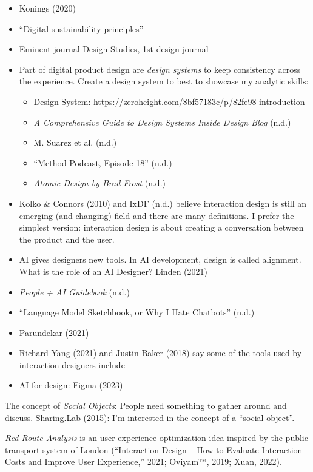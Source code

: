 \documentclass[
  letterpaper,
  DIV=11,
  numbers=noendperiod]{scrartcl}
\providecommand{\tightlist}{%
  \setlength{\itemsep}{0pt}\setlength{\parskip}{0pt}}\usepackage{longtable,booktabs,array}
\begin{document}
\begin{itemize}
\tightlist
\item
  Konings (2020)
\item
  ``Digital sustainability principles''
\item
  Eminent journal Design Studies, 1st design journal
\item
  Part of digital product design are \emph{design systems} to keep
  consistency across the experience. Create a design system to best to
  showcase my analytic skills:

  \begin{itemize}
  \tightlist
  \item
    Design System:
    https://zeroheight.com/8bf57183c/p/82fe98-introduction
  \item
    \emph{A Comprehensive Guide to Design Systems {\textbar} {Inside
    Design Blog}} (n.d.)
  \item
    M. Suarez et al. (n.d.)
  \item
    {``Method {Podcast}, {Episode} 18''} (n.d.)
  \item
    \emph{Atomic {Design} by {Brad Frost}} (n.d.)
  \end{itemize}
\item
  Kolko \& Connors (2010) and IxDF (n.d.) believe interaction design is
  still an emerging (and changing) field and there are many definitions.
  I prefer the simplest version: interaction design is about creating a
  conversation between the product and the user.
\item
  AI gives designers new tools. In AI development, design is called
  alignment. What is the role of an AI Designer? Linden (2021)
\item
  \emph{People + {AI Guidebook}} (n.d.)
\item
  {``Language {Model Sketchbook}, or {Why I Hate Chatbots}''} (n.d.)
\item
  Parundekar (2021)
\item
  Richard Yang (2021) and Justin Baker (2018) say some of the tools used
  by interaction designers include
\item
  AI for design: Figma (2023)
\end{itemize}

The concept of \emph{Social Objects}: People need something to gather
around and discuss. Sharing.Lab (2015): I'm interested in the concept of
a ``social object''.

\emph{Red Route Analysis} is an user experience optimization idea
inspired by the public transport system of London ({``Interaction
{Design} -- {How} to {Evaluate Interaction Costs} and {Improve User
Experience},''} 2021; Oviyam™, 2019; Xuan, 2022).
\end{document}
